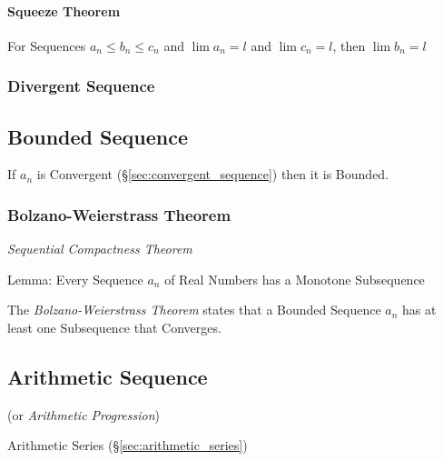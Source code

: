 \paragraph{Squeeze Theorem}\label{sec:squeeze_theorem}\hfill

For Sequences $a_n \leq b_n \leq c_n$ and $\lim a_n = l$ and $\lim c_n
= l$, then $\lim b_n = l$



\subsubsection{Divergent Sequence}\label{sec:divergent_sequence}



\subsection{Bounded Sequence}\label{sec:bounded_sequence}

If $a_n$ is Convergent (\S\ref{sec:convergent_sequence}) then it is
Bounded.



\subsubsection{Bolzano-Weierstrass Theorem}\label{sec:bolzano_weierstrass}

\emph{Sequential Compactness Theorem}

Lemma: Every Sequence $a_n$ of Real Numbers has a Monotone
Subsequence

The \emph{Bolzano-Weierstrass Theorem} states that a Bounded Sequence
$a_n$ has at least one Subsequence that Converges.



\subsection{Arithmetic Sequence}\label{sec:arithmetic_sequence}

(or \emph{Arithmetic Progression})

Arithmetic Series (\S\ref{sec:arithmetic_series})



